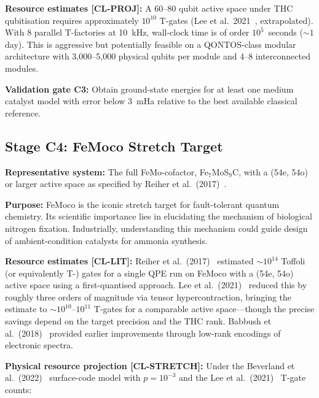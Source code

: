 \documentclass[conference]{IEEEtran}
\begin{document}
\textbf{Resource estimates [CL-PROJ]:} A 60--80 qubit active space under THC qubitisation
requires approximately $10^{10}$ T-gates (Lee et al.\ 2021~\cite{lee2021}, extrapolated). With 8
parallel T-factories at 10~kHz, wall-clock time is of order $10^5$~seconds (${\sim}1$ day).
This is aggressive but potentially feasible on a QONTOS-class modular architecture
with 3,000--5,000 physical qubits per module and 4--8 interconnected modules.

\textbf{Validation gate C3:} Obtain ground-state energies for at least one medium catalyst
model with error below 3~mHa relative to the best available classical reference.

\subsection{Stage C4: FeMoco Stretch Target}

\textbf{Representative system:} The full FeMo-cofactor, Fe$_7$MoS$_9$C, with a (54e, 54o) or
larger active space as specified by Reiher et al.\ (2017)~\cite{reiher2017}.

\textbf{Purpose:} FeMoco is the iconic stretch target for fault-tolerant quantum chemistry.
Its scientific importance lies in elucidating the mechanism of biological nitrogen
fixation. Industrially, understanding this mechanism could guide design of
ambient-condition catalysts for ammonia synthesis.

\textbf{Resource estimates [CL-LIT]:} Reiher et al.\ (2017)~\cite{reiher2017} estimated ${\sim}10^{14}$ Toffoli (or
equivalently T-) gates for a single QPE run on FeMoco with a (54e, 54o) active space
using a first-quantised approach. Lee et al.\ (2021)~\cite{lee2021} reduced this by roughly three
orders of magnitude via tensor hypercontraction, bringing the estimate to
${\sim}10^{10}$--$10^{11}$ T-gates for a comparable active space---though the precise savings
depend on the target precision and the THC rank. Babbush et al.\ (2018)~\cite{babbush2018} provided
earlier improvements through low-rank encodings of electronic spectra.

\textbf{Physical resource projection [CL-STRETCH]:} Under the Beverland et al.\ (2022)~\cite{beverland2022}
surface-code model with $p = 10^{-3}$ and the Lee et al.\ (2021)~\cite{lee2021} T-gate counts:
\end{document}
